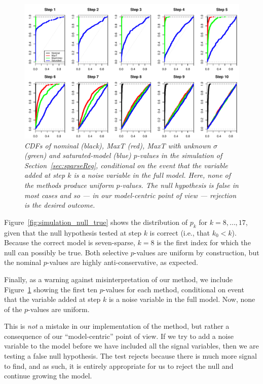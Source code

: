 \documentclass{article}
\begin{document}
\begin{figure}[h]
  \centering
  \includegraphics[width=1\textwidth]{figs/simulation_snr_5_alpha_05_noise_var.pdf}
  \caption{\em CDFs of nominal (black), MaxT (red), MaxT with unknown $\sigma$ (green) and  saturated-model (blue) $p$-values in the simulation of Section~\ref{sec:sparseReg}, conditional on the event that the variable added at step $k$ is a noise variable in the full model. Here, none of the methods produce uniform $p$-values. The null hypothesis is false in most cases and so --- in our model-centric point of view --- rejection is the desired outcome.}
  \label{fig:simulation_noise_var}
\end{figure}

Figure~\ref{fig:simulation_null_true} shows the distribution of $p_k$ for $k = 8, \ldots, 17$, given that the null hypothesis tested at step $k$ is correct (i.e., that $k_0< k$). Because the correct model is seven-sparse, $k=8$ is the first index for which the null can possibly be true. Both selective $p$-values are uniform by construction, but the nominal $p$-values are highly anti-conservative, as expected.

Finally, as a warning against misinterpretation of our method, we include Figure~\ref{fig:simulation_noise_var} showing the first ten $p$-values for each method, conditional on event that the variable added at step $k$ is a noise variable in the full model. Now, none of the $p$-values are uniform. 

This is {\em not} a mistake in our implementation of the method, but rather a consequence of our ``model-centric'' point of view. If we try to add a noise variable to the model before we have included all the signal variables, then we are testing a false null hypothesis. The test rejects because there is much more signal to find, and as such, it is entirely appropriate for us to reject the null and continue growing the model.
\end{document}
